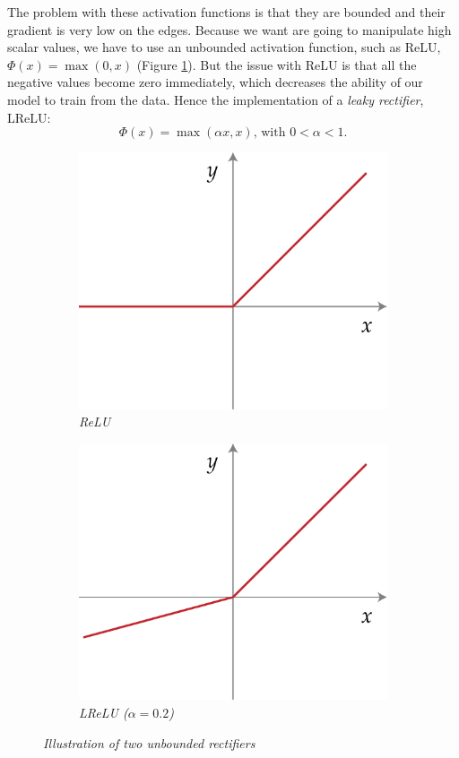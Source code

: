 \documentclass{article}
\begin{document}
            The problem with these activation functions is that they are bounded and their gradient is very low on the edges. Because we want are going to manipulate high scalar values, we have to use an unbounded activation function, such as ReLU, $\Phi(x)=\max(0,x)$ (Figure \ref{fig:relu}). But the issue with ReLU is that all the negative values become zero immediately, which decreases the ability of our model to train from the data. Hence the implementation of a \textit{leaky rectifier}, LReLU:
            $$\Phi(x)=\max(\alpha x,x)\mbox{, with } 0<\alpha<1.$$

            \begin{figure}
                \begin{subfigure}{.49\linewidth}
                    \centering
                    \includegraphics[width=.8\linewidth]{pics/act-relu.png}
                    \caption{\textit{ReLU}}
                    \label{fig:relu}
                \end{subfigure}
                \begin{subfigure}{.49\linewidth}
                    \centering
                    \includegraphics[width=.8\linewidth]{pics/act-lrelu.png}
                    \caption{\textit{LReLU ($\alpha=0.2$)}}
                    \label{fig:lrelu}
                \end{subfigure}
                \caption{\textit{Illustration of two unbounded rectifiers}}
            \end{figure}
\end{document}

